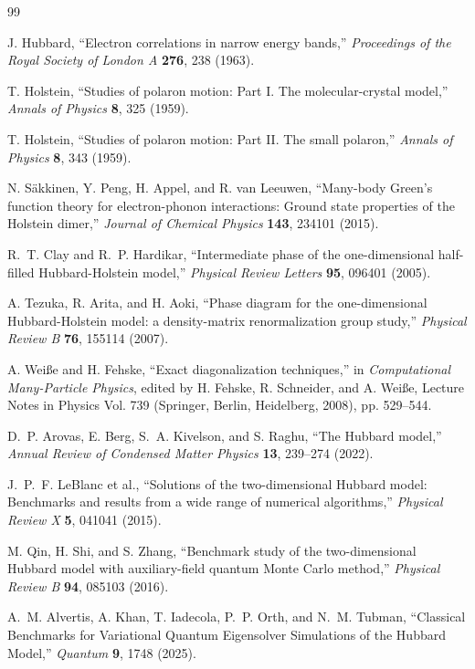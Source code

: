 \documentclass[
  reprint,
  amsmath,
  amssymb,
  aps,
  pra,
  nofootinbib,
  superscriptaddress,
  floatfix
]{revtex4-2}
\begin{document}
\clearpage
\begin{thebibliography}{99}

J. Hubbard,
``Electron correlations in narrow energy bands,''
\emph{Proceedings of the Royal Society of London A} \textbf{276}, 238 (1963).

T. Holstein,
``Studies of polaron motion: Part I. The molecular-crystal model,''
\emph{Annals of Physics} \textbf{8}, 325 (1959).

T. Holstein,
``Studies of polaron motion: Part II. The small polaron,''
\emph{Annals of Physics} \textbf{8}, 343 (1959).

N. S\"akkinen, Y. Peng, H. Appel, and R. van Leeuwen,
``Many-body Green's function theory for electron-phonon interactions: Ground state properties of the Holstein dimer,''
\emph{Journal of Chemical Physics} \textbf{143}, 234101 (2015).

R.~T. Clay and R.~P. Hardikar,
``Intermediate phase of the one-dimensional half-filled Hubbard-Holstein model,''
\emph{Physical Review Letters} \textbf{95}, 096401 (2005).

A. Tezuka, R. Arita, and H. Aoki,
``Phase diagram for the one-dimensional Hubbard-Holstein model: a density-matrix renormalization group study,''
\emph{Physical Review B} \textbf{76}, 155114 (2007).

A. Wei{\ss}e and H. Fehske,
``Exact diagonalization techniques,''
in \emph{Computational Many-Particle Physics},
edited by H. Fehske, R. Schneider, and A. Wei{\ss}e,
Lecture Notes in Physics Vol. 739 (Springer, Berlin, Heidelberg, 2008), pp. 529--544.

D.~P. Arovas, E. Berg, S.~A. Kivelson, and S. Raghu,
``The Hubbard model,''
\emph{Annual Review of Condensed Matter Physics} \textbf{13}, 239--274 (2022).

J.~P.~F. LeBlanc et al.,
``Solutions of the two-dimensional Hubbard model: Benchmarks and results from a wide range of numerical algorithms,''
\emph{Physical Review X} \textbf{5}, 041041 (2015).

M. Qin, H. Shi, and S. Zhang,
``Benchmark study of the two-dimensional Hubbard model with auxiliary-field quantum Monte Carlo method,''
\emph{Physical Review B} \textbf{94}, 085103 (2016).

A.~M. Alvertis, A. Khan, T. Iadecola, P.~P. Orth, and N.~M. Tubman,
``Classical Benchmarks for Variational Quantum Eigensolver Simulations of the Hubbard Model,''
\emph{Quantum} \textbf{9}, 1748 (2025).


\end{thebibliography}
\end{document}
